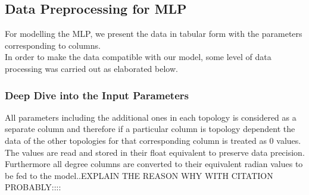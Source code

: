 \documentclass{report} %
\begin{document}
\subsection*{Data Preprocessing for \ac{MLP}}

For modelling the \ac{MLP}, we present the data in tabular form with the parameters corresponding to columns. \\
In order to make the data compatible with our model, some level of data processing was carried out as elaborated below.

\subsubsection*{Deep Dive into the Input Parameters}
All parameters including the additional ones in each topology is considered as a separate column and therefore if a particular column is topology dependent the data of the other topologies for that corresponding column is treated as 0 values.\\
The values are read and stored in their float equivalent to preserve data precision. Furthermore all degree columns are converted to their equivalent radian values to be fed to the model..EXPLAIN THE REASON WHY WITH CITATION PROBABLY::::\\
\end{document}
